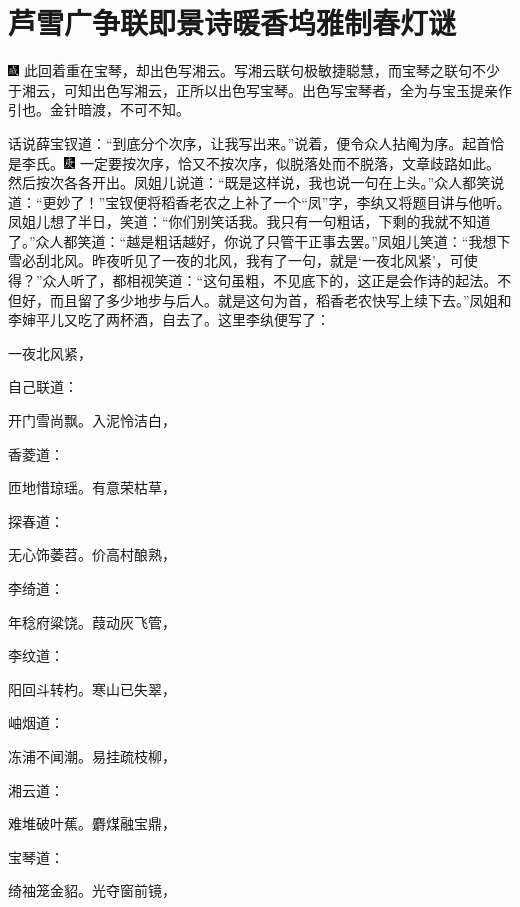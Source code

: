 

\chapter{芦雪广争联即景诗\hspace{.5em}暖香坞雅制春灯谜}

{\includegraphics[width=3mm]{../Images/00005}  \kaishu 此回着重在宝琴，却出色写湘云。写湘云联句极敏捷聪慧，而宝琴之联句不少于湘云，可知出色写湘云，正所以出色写宝琴。出色写宝琴者，全为与宝玉提亲作引也。金针暗渡，不可不知。}

话说薛宝钗道：``到底分个次序，让我写出来。''说着，便令众人拈阄为序。起首恰是李氏。{\includegraphics[width=3mm]{../Images/00004}  \kaishu 一定要按次序，恰又不按次序，似脱落处而不脱落，文章歧路如此。}然后按次各各开出。凤姐儿说道：``既是这样说，我也说一句在上头。''众人都笑说道：``更妙了！''宝钗便将稻香老农之上补了一个``凤''字，李纨又将题目讲与他听。凤姐儿想了半日，笑道：``你们别笑话我。我只有一句粗话，下剩的我就不知道了。''众人都笑道：``越是粗话越好，你说了只管干正事去罢。''凤姐儿笑道：``我想下雪必刮北风。昨夜听见了一夜的北风，我有了一句，就是`一夜北风紧'，可使得？''众人听了，都相视笑道：``这句虽粗，不见底下的，这正是会作诗的起法。不但好，而且留了多少地步与后人。就是这句为首，稻香老农快写上续下去。''凤姐和李婶平儿又吃了两杯酒，自去了。这里李纨便写了：

一夜北风紧，

自己联道：

开门雪尚飘。入泥怜洁白，

香菱道：

匝地惜琼瑶。有意荣枯草，

探春道：

无心饰萎苕。价高村酿熟，

李绮道：

年稔府粱饶。葭动灰飞管，

李纹道：

阳回斗转杓。寒山已失翠，

岫烟道：

冻浦不闻潮。易挂疏枝柳，

湘云道：

难堆破叶蕉。麝煤融宝鼎，

宝琴道：

绮袖笼金貂。光夺窗前镜，

